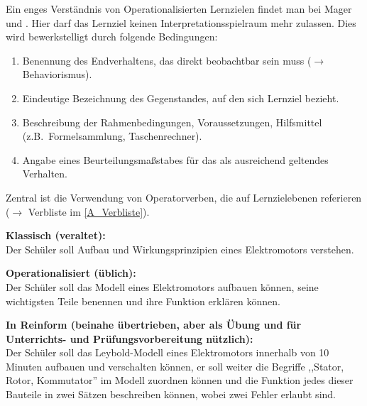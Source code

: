 \mip
Ein enges Verständnis von Operationalisierten Lernzielen findet man bei Mager und \textcite{Gagne}. Hier darf das Lernziel keinen Interpretations\-spielraum mehr zulassen. Dies wird bewerkstelligt durch folgende Bedingungen:
\begin{enumerate}
	\item	Benennung des Endverhaltens, das direkt beobachtbar sein muss ($\to$ Behaviorismus).
	\item	Eindeutige Bezeichnung des Gegenstandes, auf den sich Lernziel bezieht.
	\item	Beschreibung der Rahmenbedingungen, Voraussetzungen, Hilfsmittel (z.B.\ Formelsammlung, Taschenrechner).
	\item	Angabe eines Beurteilungsma{\ss}stabes  f\"{u}r das als ausreichend 	geltendes Verhalten.
\end{enumerate} 
Zentral ist die Verwendung von Operatorverben, die auf Lernzielebenen referieren ($\to$ Verbliste im \cref{A_Verbliste}).

\begin{beisp}
	\textbf{Klassisch (veraltet):} \\ 
	Der Sch\"{u}ler soll Aufbau und Wirkungsprinzipien eines
	Elektromotors verstehen.
	
	\mip
	\textbf{Operationalisiert (üblich):} \\
	Der Sch\"{u}ler soll das Modell eines Elektromotors aufbauen k\"{o}nnen,
	seine wichtigsten Teile benennen und ihre Funktion erkl\"{a}ren k\"{o}nnen.
	
	\mip
	\textbf{In Reinform (beinahe übertrieben, aber als Übung und für Unterrichts- und Prüfungsvorbereitung nützlich):} \\
	Der Sch\"{u}ler soll das Leybold-Modell eines Elektromotors
		innerhalb von 10 Minuten aufbauen und verschalten k\"{o}nnen, er
		soll weiter die Begriffe ,,Stator, Rotor, Kommutator'' im
		Modell zuordnen k\"{o}nnen und die Funktion jedes dieser Bauteile
		in zwei S\"{a}tzen beschreiben k\"{o}nnen, wobei zwei Fehler erlaubt
		sind.
\end{beisp}


